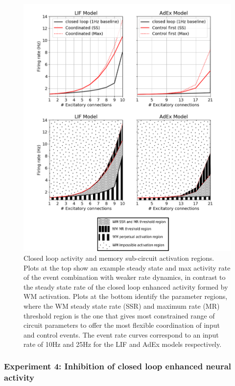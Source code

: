 \documentclass[10pt]{article}
\begin{document}
\begin{figure}[h!]
  \begin{center}
    \includegraphics[width=0.70\columnwidth]{figures/experiment_3/experiment_3}

    \caption{Closed loop activity and memory sub-circuit activation
      regions. Plots at the top show an example steady state and max
      activity rate of the event combination with weaker rate
      dynamics, in contrast to the steady state rate of the closed
      loop enhanced activity formed by WM activation. Plots at the
      bottom identify the parameter regions, where the WM steady state
      rate (SSR) and maximum rate (MR) threshold region is the one
      that gives most constrained range of circuit parameters to offer
      the most flexible coordination of input and control events. The
      event rate curves correspond to an input rate of 10Hz and 25Hz
      for the LIF and AdEx models respectively.}
    \label{197355}

  \end{center}
\end{figure}

\subsubsection{Experiment 4: Inhibition of closed loop enhanced neural
  activity}

{\label{554287}}
\end{document}

